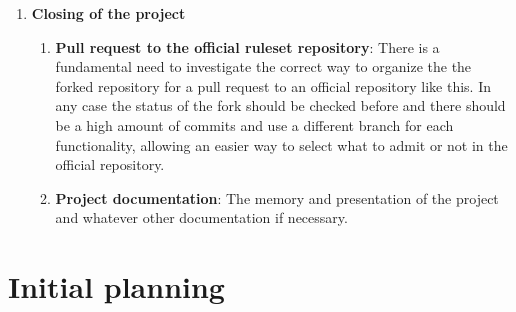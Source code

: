 \begin{enumerate}
	\item \textbf{Closing of the project}
	\begin{enumerate}[label=\alph*]
		\item \textbf{Pull request to the official ruleset repository}: There is a fundamental need to investigate the correct way to organize the the forked repository for a pull request to an official repository like this. In any case the status of the fork should be checked before and there should be a high amount of commits and use a different branch for each functionality, allowing an easier way to select what to admit or not in the official repository.
		\item \textbf{Project documentation}: The memory and presentation of the project and whatever other documentation if necessary.
	\end{enumerate}
\end{enumerate}







\section{Initial planning}










\newcommand{\Duno}{0}
\newcommand{\Ddos}{7}
\newcommand{\Dtres}{28}
\newcommand{\Dcuatro}{7}
\newcommand{\Dcinco}{21}
\newcommand{\Dseis}{7}
\newcommand{\Dsiete}{21}
\newcommand{\Docho}{14}
\newcommand{\Dnueve}{14}
\newcommand{\Ddiez}{14}

\newcommand{\Funo}{\the\numexpr \Duno /7 \relax}
\newcommand{\Fdos}{\the\numexpr \Funo + \Ddos/7 \relax}
\newcommand{\Ftres}{\the\numexpr \Fdos + \Dtres/7 \relax}
\newcommand{\Fcuatro}{\the\numexpr \Ftres + \Dcuatro/7 \relax}
\newcommand{\Fcinco}{\the\numexpr \Fcuatro + \Dcinco/7 \relax}
\newcommand{\Fseis}{\the\numexpr \Fcinco + \Dseis/7 \relax}
\newcommand{\Fsiete}{\the\numexpr \Fseis + \Dsiete/7 \relax}
\newcommand{\Focho}{\the\numexpr \Fsiete + \Docho/7 \relax}
\newcommand{\Fnueve}{\the\numexpr \Focho + \Dnueve/7 \relax}
\newcommand{\Fdiez}{\the\numexpr \Fnueve + \Ddiez/7 \relax}

